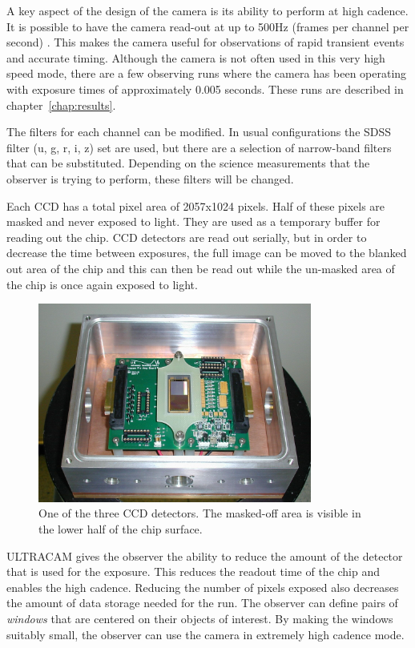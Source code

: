A key aspect of the design of the camera is its ability to perform at high cadence. It is possible to have the camera read-out at up to 500Hz (frames per channel per second) \cite{dhillon07}. This makes the camera useful for observations of rapid transient events and accurate timing. Although the camera is not often used in this very high speed mode, there are a few observing runs where the camera has been operating with exposure times of approximately 0.005 seconds. These runs are described in chapter~\ref{chap:results}.

The filters for each channel can be modified. In usual configurations the SDSS filter (u, g, r, i, z) set are used, but there are a selection of narrow-band filters that can be substituted. Depending on the science measurements that the observer is trying to perform, these filters will be changed.   

Each CCD has a total pixel area of 2057x1024 pixels. Half of these pixels are masked and never exposed to light. They are used as a temporary buffer for reading out the chip. CCD detectors are read out serially, but in order to decrease the time between exposures, the full image can be moved to the blanked out area of the chip and this can then be read out while the un-masked area of the chip is once again exposed to light. 

\begin{figure}[!h]
\centering
\includegraphics[width=90mm]{images/ccd.png}
\caption{One of the three CCD detectors. The masked-off area is visible in the lower half of the chip surface.}
\label{fig2}
\end{figure}

ULTRACAM gives the observer the ability to reduce the amount of the detector that is used for the exposure. This reduces the readout time of the chip and enables the high cadence. Reducing the number of pixels exposed also decreases the amount of data storage needed for the run. The observer can define pairs of \emph{windows} that are centered on their objects of interest. By making the windows suitably small, the observer can use the camera in extremely high cadence mode. 

